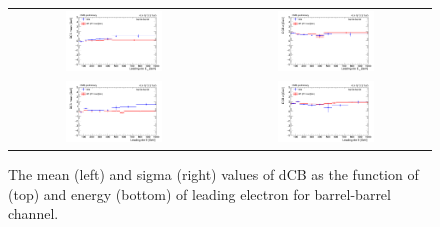 \begin{figure}[ht]
  \begin{center}
    \begin{tabular}{cc}
      \includegraphics[width=0.48\textwidth]{figures/Zprime/2017/mass_resolution/scale_check/h_led_Et_Mee_BB_scale} &
      \includegraphics[width=0.48\textwidth]{figures/Zprime/2017/mass_resolution/scale_check/h_led_Et_Mee_BB_resolution} \\
      \includegraphics[width=0.48\textwidth]{figures/Zprime/2017/mass_resolution/scale_check/h_led_E_Mee_BB_scale} &
      \includegraphics[width=0.48\textwidth]{figures/Zprime/2017/mass_resolution/scale_check/h_led_E_Mee_BB_resolution}
    \end{tabular}
    \caption{The mean (left) and sigma (right) values of dCB as the function of \et (top) and energy (bottom) of leading electron for barrel-barrel channel.
    \label{fig:data_MC_Et_E_BB}}
  \end{center}
\end{figure}

